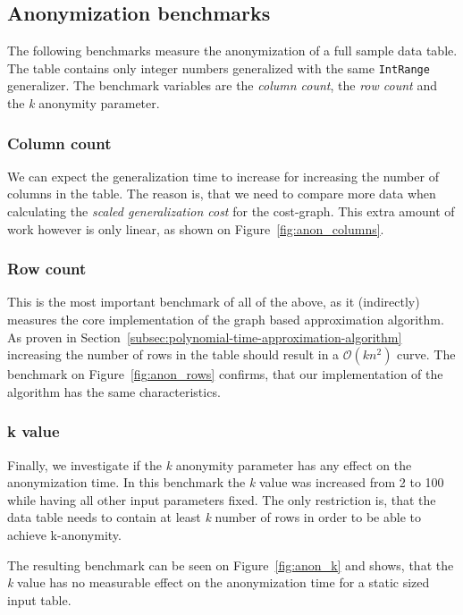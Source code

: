 \vspace{\baselineskip}


\vspace{\baselineskip}


\subsection{Anonymization benchmarks}

The following benchmarks measure the anonymization of a full sample data table. The table contains only integer numbers generalized with the same \texttt{IntRange} generalizer. The benchmark variables are the \emph{column count}, the \emph{row count} and the \emph{k} anonymity parameter.

\subsubsection{Column count}

We can expect the generalization time to increase for increasing the number of columns in the table. The reason is, that we need to compare more data when calculating the \emph{scaled generalization cost} for the cost-graph. This extra amount of work however is only linear, as shown on Figure~\ref{fig:anon_columns}.

\vspace{\baselineskip}


\subsubsection{Row count}

This is the most important benchmark of all of the above, as it (indirectly) measures the core implementation of the graph based approximation algorithm. As proven in Section~\ref{subsec:polynomial-time-approximation-algorithm} increasing the number of rows in the table should result in a \(\mathcal{O}(kn^2)\) curve. The benchmark on Figure~\ref{fig:anon_rows} confirms, that our implementation of the algorithm has the same characteristics.

\vspace{\baselineskip}


\subsubsection{k value}

Finally, we investigate if the \emph{k} anonymity parameter has any effect on the anonymization time. In this benchmark the \emph{k} value was increased from 2 to 100 while having all other input parameters fixed. The only restriction is, that the data table needs to contain at least \emph{k} number of rows in order to be able to achieve k-anonymity.

The resulting benchmark can be seen on Figure~\ref{fig:anon_k} and shows, that the \emph{k} value has no measurable effect on the anonymization time for a static sized input table.

\vspace{\baselineskip}

